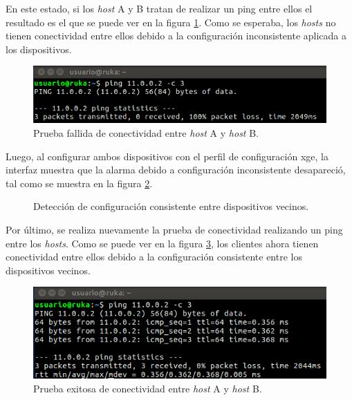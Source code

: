       En este estado, si los \textit{host} A y B tratan de realizar un ping entre ellos el resultado es el que se puede ver en la figura \ref{fig:test9_2}. Como se esperaba, los \textit{hosts} no tienen conectividad entre ellos debido a la configuración inconsistente aplicada a los dispositivos.

      \begin{figure}[H]
        \centering
        \includegraphics[scale=0.7]{Figures/test9_2.png}
        \caption{Prueba fallida de conectividad entre \textit{host} A y \textit{host} B.}
        \label{fig:test9_2}
      \end{figure}

      Luego, al configurar ambos dispositivos con el perfil de configuración xge, la interfaz muestra que la alarma debido a configuración inconsistente desapareció, tal como se muestra en la figura \ref{fig:test9_3}.


      \begin{figure}[H]
        \centering
        \caption{Detección de configuración consistente entre dispositivos vecinos.}
        \label{fig:test9_3}
      \end{figure}

      Por último, se realiza nuevamente la prueba de conectividad realizando un ping entre los \textit{hosts}. Como se puede ver en la figura \ref{fig:test9_4}, los clientes ahora tienen conectividad entre ellos debido a la configuración consistente entre los dispositivos vecinos.

      \begin{figure}[H]
        \centering
        \includegraphics[scale=0.7]{Figures/test9_4.png}
        \caption{Prueba exitosa de conectividad entre \textit{host} A y \textit{host} B.}
        \label{fig:test9_4}
      \end{figure}
